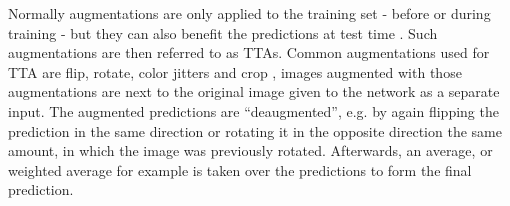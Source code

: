 Normally augmentations are only applied to the training set - before or during training - but they can also benefit the predictions at test time \cite{tta_segmentation_cells}\cite{when_tta_works}.
Such augmentations are then referred to as \acp{TTA}.
Common augmentations used for \ac{TTA} are flip, rotate, color jitters and crop \cite{when_tta_works}, images augmented with those augmentations are next to the original image given to the network as a separate input.
The augmented predictions are ``deaugmented'', e.g. by again flipping the prediction in the same direction or rotating it in the opposite direction the same amount, in which the image was previously rotated.
Afterwards, an average, or weighted average for example is taken over the predictions to form the final prediction.
